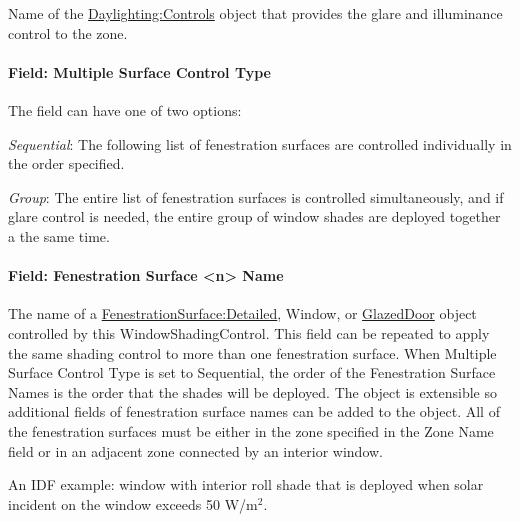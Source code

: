 Name of the \hyperref[daylightingcontrols-000]{Daylighting:Controls} object that provides the glare and illuminance control to the zone.

\paragraph{Field: Multiple Surface Control Type}\label{field-multiple-surface-control-type}

The field can have one of two options:

\emph{Sequential}: The following list of fenestration surfaces are controlled individually in the order specified.

\emph{Group}: The entire list of fenestration surfaces is controlled simultaneously, and if glare control is needed, the entire group of window shades are deployed together a the same time.

\paragraph{Field: Fenestration Surface <n> Name}\label{field-fenestration-surface1-name}

The name of a \hyperref[fenestrationsurfacedetailed]{FenestrationSurface:Detailed}, Window, or \hyperref[glazeddoor]{GlazedDoor} object controlled by this WindowShadingControl. This field can be repeated to apply the same shading control to more than one fenestration surface. When Multiple Surface Control Type is set to Sequential, the order of the Fenestration Surface Names is the order that the shades will be deployed. The object is extensible so additional fields of fenestration surface names can be added to the object. All of the fenestration surfaces must be either in the zone specified in the Zone Name field or in an adjacent zone connected by an interior window.

An IDF example: window with interior roll shade that is deployed when solar incident on the window exceeds 50 W/m\(^{2}\).

